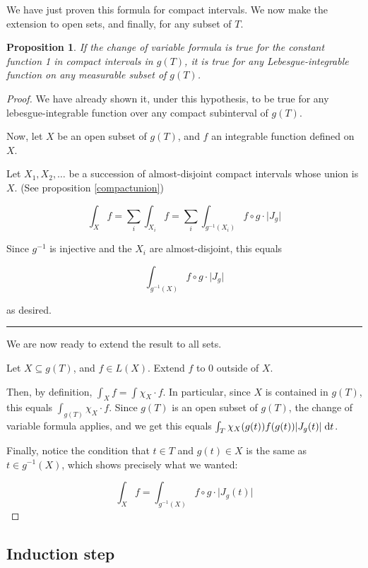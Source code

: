 \documentclass[11pt]{article}
\theoremstyle{definition}
\theoremstyle{plain}
\newtheorem{prop}{Proposition}
\newcommand{\mo}{^{-1}}
\begin{document}
We have just proven this formula for compact intervals. We now make the extension to open sets, and finally, for any subset of $T$.

\begin{prop}
If the change of variable formula is true for the constant function 1 in compact intervals in $g(T)$, it is true for any Lebesgue-integrable function on any measurable subset of $g(T)$.
\end{prop}

\begin{proof}
We have already shown it, under this hypothesis, to be true for any lebesgue-integrable function over any compact subinterval of $g(T)$.

Now, let $X$ be an open subset of $g(T)$, and $f$ an integrable function defined on $X$.

Let $X_1, X_2, \ldots$ be a succession of almost-disjoint compact intervals whose union is $X$. (See proposition \ref{compactunion})

\[\int_{X} f = \sum_i \int_{X_i} f = \sum_i \int_{g\mo(X_i)} f \circ g \cdot \lvert J_g \rvert\]

Since $g\mo$ is injective and the $X_i$ are almost-disjoint, this equals

\[\int_{g\mo(X)} f \circ g \cdot \lvert J_g \rvert\]

as desired.

\noindent\rule{\textwidth}{1pt}

We are now ready to extend the result to all sets.

Let $X \subseteq g(T)$, and $f \in L(X)$. Extend $f$ to 0 outside of $X$.

Then, by definition, $\int_X f = \int \chi_X \cdot f$. In particular, since $X$ is contained in $g(T)$, this equals $\int_{g(T)} \chi_X \cdot f$. Since $g(T)$ is an open subset of $g(T)$, the change of variable formula applies, and we get this equals $\int_{T} \chi_X(g(t)) f(g(t)) \lvert J_g(t) \rvert \d{t}$.

Finally, notice the condition that $t \in T$ and $g(t) \in X$ is the same as $t \in g\mo(X)$, which shows precisely what we wanted:

\[ \int_X f = \int_{g\mo(X)} f \circ g \cdot \lvert J_g(t) \rvert \]
\end{proof}

\subsection{Induction step}
\end{document}
